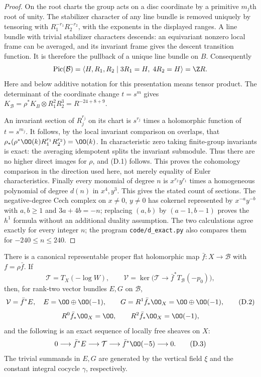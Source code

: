 \begin{proof}
On the root charts the group acts on a disc coordinate by a primitive
$m_j$th root of unity. The stabilizer character of any line bundle is
removed uniquely by tensoring with $R_1^{-r_1}R_2^{-r_2}$, with the
exponents in the displayed ranges. A line bundle with trivial stabilizer
characters descends: an equivariant nonzero local frame can be averaged,
and its invariant frame gives the descent transition function. It is
therefore the pullback of a unique line bundle on $B$. Consequently
\[
 \operatorname{Pic}(\mathcal B)=
 \langle H,R_1,R_2\mid 3R_1=H,\;4R_2=H\rangle=\Z R.
\]
Here and below additive notation for this presentation means tensor
product. The determinant of the coordinate change $t=s^m$ gives
$K_{\mathcal B}=\rho^*K_B\otimes R_1^2R_2^3=R^{-24+8+9}$.

An invariant section of $R_j^{r_j}$ on its chart is $s^{r_j}$ times a
holomorphic function of $t=s^{m_j}$. It follows, by the local invariant
comparison on overlaps, that
$\rho_*(\rho^*\OO(k)R_1^{r_1}R_2^{r_2})=\OO(k)$.
In characteristic zero taking finite-group invariants is exact: the
averaging idempotent splits the invariant submodule. Thus there are no
higher direct images for $\rho$, and (D.1) follows. This proves the
cohomology comparison in the direction used here, not merely equality
of Euler characteristics. Finally every monomial of degree $n$ is
$x^{r_2}y^{r_1}$ times a homogeneous polynomial of degree $d(n)$ in
$x^4,y^3$. This gives the stated count of sections. The negative-degree
Cech complex on $x\ne0$, $y\ne0$ has cokernel represented by
$x^{-a}y^{-b}$ with $a,b\ge1$ and $3a+4b=-n$; replacing $(a,b)$ by
$(a-1,b-1)$ proves the $h^1$ formula without an additional duality
assumption. The two calculations agree exactly for every integer $n$;
the program \texttt{code/d\_exact.py} also compares them for
$-240\le n\le240$.
\end{proof}

\begin{proposition}\label{inv:D1.2}
There is a canonical representable proper flat holomorphic map
$\bar f:X\to\mathcal B$ with $f=\rho\bar f$. If
\[
 \mathcal T=T_X(-\log W),\qquad
 \mathcal V=\ker\bigl(\mathcal T\to
                   \bar f^*T_{\mathcal B}(-p_0)\bigr),
\]
then, for rank-two vector bundles $E,G$ on $\mathcal B$,
\[
 \mathcal V=\bar f^*E,\quad E=\OO\oplus\OO(-1),\qquad
 G=R^1\bar f_*\OO_X=\OO\oplus\OO(-1),                 \tag{D.2}
\]
\[
 R^0\bar f_*\OO_X=\OO,\qquad R^2\bar f_*\OO_X=\OO(-1),
\]
and the following is an exact sequence of locally free sheaves on $X$:
\[
 0\longrightarrow\bar f^*E\longrightarrow\mathcal T
 \longrightarrow\bar f^*\OO(-5)\longrightarrow0.       \tag{D.3}
\]
The trivial summands in $E,G$ are generated by the vertical field $\xi$
and the constant integral cocycle $\gamma$, respectively.
\end{proposition}


